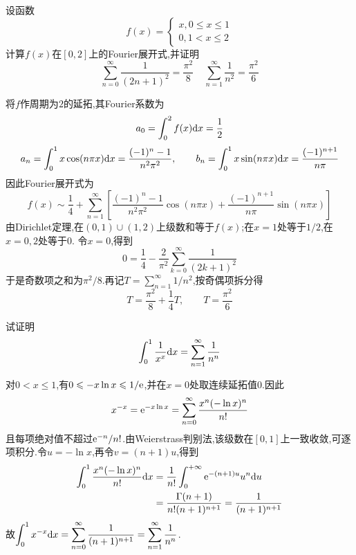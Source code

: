 \documentclass{ctexart}
\begin{document}
\begin{problem}[8.(13\songti{分})]
设函数
        \[f(x)=\left\{\begin{array}{l}
            x,0\leqslant x\leqslant 1\\
            0,1<x\leqslant 2
        \end{array}\right.\]
        计算$f(x)$在$[0,2]$上的Fourier展开式,并证明
        \[\sum_{n=0}^{\infty}\dfrac{1}{(2n+1)^2}=\dfrac{\pi^2}{8}\ \ \ \ \ \sum_{n=1}^{\infty}\dfrac{1}{n^2}=\dfrac{\pi^2}{6}\]
\end{problem}
\begin{solution}
将$f$作周期为$2$的延拓,其Fourier系数为
\[a_0=\int_0^2 f(x)\mathrm{d} x=\frac12\]
\[a_n=\int_0^1x\cos(n\pi x)\mathrm{d} x=\frac{(-1)^n-1}{n^2\pi^2},\qquad
b_n=\int_0^1x\sin(n\pi x)\mathrm{d} x=\frac{(-1)^{n+1}}{n\pi}\]
因此Fourier展开式为
\[f(x)\sim\frac14+\sum_{n=1}^{\infty}\left[
\frac{(-1)^n-1}{n^2\pi^2}\cos(n\pi x)+\frac{(-1)^{n+1}}{n\pi}\sin(n\pi x)\right]\]
由Dirichlet定理,在$(0,1)\cup(1,2)$上级数和等于$f(x)$;在$x=1$处等于$1/2$,在$x=0,2$处等于$0$.
令$x=0$,得到
\[0=\frac14-\frac{2}{\pi^2}\sum_{k=0}^{\infty}\frac1{(2k+1)^2}\]
于是奇数项之和为$\pi^2/8$.再记$T=\sum_{n=1}^{\infty}1/n^2$,按奇偶项拆分得
\[T=\frac{\pi^2}{8}+\frac14T,\qquad T=\frac{\pi^2}{6}\]
\end{solution}

\begin{problem}[9.(5\songti{分})]
试证明
        \[\int_0^1\dfrac{1}{x^x}\mathrm{d} x=\sum_{n=1}^{\infty}\dfrac{1}{n^n}\]
\end{problem}
\begin{solution}
对$0<x\leqslant1$,有$0\leqslant-x\ln x\leqslant1/\mathrm{e}$,并在$x=0$处取连续延拓值$0$.因此
\[x^{-x}=\mathrm{e}^{-x\ln x}=\sum_{n=0}^{\infty}\frac{x^n(-\ln x)^n}{n!}\]
且每项绝对值不超过$\mathrm{e}^{-n}/n!$.由Weierstrass判别法,该级数在$[0,1]$上一致收敛,可逐项积分.令$u=-\ln x$,再令$v=(n+1)u$,得到
\[\begin{aligned}
\int_0^1\frac{x^n(-\ln x)^n}{n!}\mathrm{d} x
&=\frac1{n!}\int_0^{+\infty}\mathrm{e}^{-(n+1)u}u^n\mathrm{d} u\\
&=\frac{\Gamma(n+1)}{n!(n+1)^{n+1}}=\frac1{(n+1)^{n+1}}
\end{aligned}\]
故$\displaystyle\int_0^1x^{-x}\mathrm{d} x=\sum_{n=0}^{\infty}\frac1{(n+1)^{n+1}}=\sum_{n=1}^{\infty}\frac1{n^n}$.
\end{solution}
\end{document}
